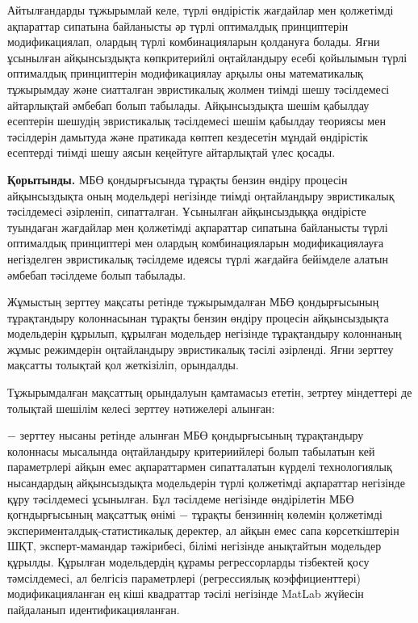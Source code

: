 \begin{multicols}{2}
Айтылғандарды тұжырымлай келе, түрлі өндірістік жағдайлар мен қолжетімді
ақпараттар сипатына байланысты әр түрлі оптималдық принциптерін
модификациялап, олардың түрлі комбинацияларын қолдануға болады. Яғни
ұсынылған айқынсыздықта көпкритерийлі оңтайландыру есебі қойылымын түрлі
оптималдық принциптерін модификациялау арқылы оны математикалық
тұжырымдау және сиатталған эвристикалық жолмен тиімді шешу тәсілдемесі
айтарлықтай әмбебап болып табылады. Айқынсыздықта шешім қабылдау
есептерін шешудің эвристикалық тәсілдемесі шешім қабылдау теориясы мен
тәсілдерін дамытуда және пратикада көптеп кездесетін мұндай өндірістік
есептерді тиімді шешу аясын кеңейтуге айтарлықтай үлес қосады.

{\bfseries Қорытынды.} МБӨ қондырғысында тұрақты бензин өндіру процесін
айқынсыздықта оның модельдері негізінде тиімді оңтайландыру эвристикалық
тәсілдемесі әзірленіп, сипатталған. Ұсынылған айқынсыздыққа өндірісте
туындаған жағдайлар мен қолжетімді ақпараттар сипатына байланысты түрлі
оптималдық принциптері мен олардың комбинацияларын модификациялауға
негізделген эвристикалық тәсілдеме идеясы түрлі жағдайға бейімделе
алатын әмбебап тәсілдеме болып табылады.

Жұмыстың зерттеу мақсаты ретінде тұжырымдалған МБӨ қондырғысының
тұрақтандыру колоннасынан тұрақты бензин өндіру процесін айқынсыздықта
модельдерін құрылып, құрылған модельдер негізінде тұрақтандыру
колоннаның жұмыс режимдерін оңтайландыру эвристикалық тәсілі әзірленді.
Яғни зерттеу мақсатты толықтай қол жеткізіліп, орындалды.

Тұжырымдалған мақсаттың орындалуын қамтамасыз ететін, зетртеу міндеттері
де толықтай шешілім келесі зерттеу нәтижелері алынған:

− зерттеу нысаны ретінде алынған МБӨ қондырғысының тұрақтандыру
колоннасы мысалында оңтайландыру критериийлері болып табылатын кей
параметрлері айқын емес ақпараттармен сипатталатын күрделі технологиялық
нысандардың айқынсыздықта модельдерін түрлі қолжетімді ақпараттар
негізінде құру тәсілдемесі ұсынылған. Бұл тәсілдеме негізінде
өндірілетін МБӨ қогндырғысының мақсаттық өнімі − тұрақты бензиннің
көлемін қолжетімді эксперименталдық-статистикалық деректер, ал айқын
емес сапа көрсеткіштерін ШҚТ, эксперт-мамандар тәжірибесі, білімі
негізінде анықтайтын модельдер құрылды. Құрылған модельдердің құрамы
регрессорларды тізбектей қосу тәмсілдемесі, ал белгісіз параметрлері
(регрессиялық коэффициенттері) модификацияланған ең кіші квадраттар
тәсілі негізінде MatLab жүйесін пайдаланып идентификацияланған.


\end{multicols}
